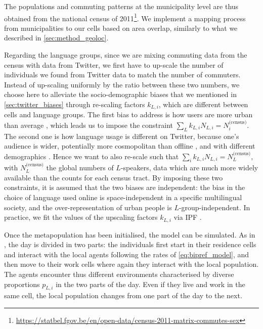 \documentclass[../thesis.tex]{subfiles}
\begin{document}
The populations and commuting patterns at the municipality level are thus obtained from
the national census of
2011\footnote{\url{https://statbel.fgov.be/en/open-data/census-2011-matrix-commutes-sex}}.
We implement a mapping process from municipalities to our cells based on area overlap,
similarly to what we described in \cref{sec:method_geoloc}.

Regarding the language groups, since we are mixing commuting data from the census with
data from Twitter, we first have to up-scale the number of individuals we found from
Twitter data to match the number of commuters. Instead of up-scaling uniformly by the
ratio between these two numbers, we choose here to alleviate the socio-demographic
biases that we mentioned in \cref{sec:twitter_biases} through re-scaling factors
$k_{L,i}$, which are different between cells and language groups. The first bias to
address is how users are more urban than average
\cite{MisloveUnderstandingDemographics2011}, which leads us to impose the constraint
$\sum_L k_{L,i} N_{L,i} = N_i^\text{(census)}$. The second one is how language usage is
different on Twitter, because one's audience is wider, potentially more cosmopolitan
than offline \cite{NguyenAudienceUse2015}, and with different demographics
\cite{MisloveUnderstandingDemographics2011}. Hence we want to also re-scale such that
$\sum_i k_{L,i} N_{L,i} = N_L^\text{(census)}$, with $N_L^\text{(census)}$ the global
numbers of $L$-speakers, data which are much more widely available than the counts for
each census tract. By imposing these two constraints, it is assumed that the two biases
are independent: the bias in the choice of language used online is space-independent in
a specific multilingual society, and the over-representation of urban people is
$L$-group-independent. In practice, we fit the values of the upscaling factors $k_{L,
i}$ via \ac{IPF} \cite{DemingLeastSquares1940,FienbergIterativeProcedure1970}.

Once the metapopulation has been initialised, the model can be simulated. As in
\cite{Fernandez-GraciaVoterModel2014}, the day is divided in two parts: the individuals
first start in their residence cells and interact with the local agents following the
rates of \cref{eq:bipref_model}, and then move to their work cells where again they
interact with the local population. The agents encounter thus different environments
characterised by diverse proportions $p_{L,i}$ in the two parts of the day. Even if they
live and work in the same cell, the local population changes from one part of the day to
the next.
\end{document}

